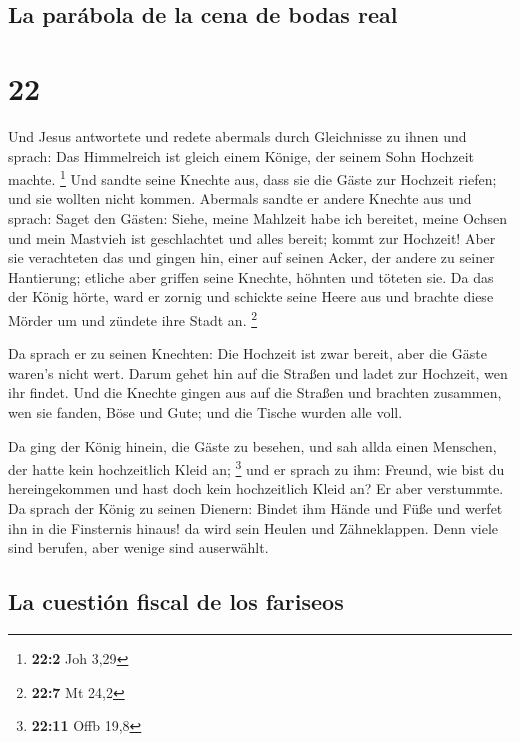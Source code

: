 \hypertarget{la-paruxe1bola-de-la-cena-de-bodas-real}{%
\subsection{La parábola de la cena de bodas
real}\label{la-paruxe1bola-de-la-cena-de-bodas-real}}

\hypertarget{section-21}{%
\section{22}\label{section-21}}

 Und Jesus antwortete und redete abermals durch
Gleichnisse zu ihnen und sprach:  Das Himmelreich ist
gleich einem Könige, der seinem Sohn Hochzeit machte. \footnote{\textbf{22:2}
  Joh 3,29}  Und sandte seine Knechte aus, dass sie die
Gäste zur Hochzeit riefen; und sie wollten nicht kommen. 
Abermals sandte er andere Knechte aus und sprach: Saget den Gästen:
Siehe, meine Mahlzeit habe ich bereitet, meine Ochsen und mein Mastvieh
ist geschlachtet und alles bereit; kommt zur Hochzeit! 
Aber sie verachteten das und gingen hin, einer auf seinen Acker, der
andere zu seiner Hantierung;  etliche aber griffen seine
Knechte, höhnten und töteten sie.  Da das der König hörte,
ward er zornig und schickte seine Heere aus und brachte diese Mörder um
und zündete ihre Stadt an. \footnote{\textbf{22:7} Mt 24,2}

 Da sprach er zu seinen Knechten: Die Hochzeit ist zwar
bereit, aber die Gäste waren's nicht wert.  Darum gehet
hin auf die Straßen und ladet zur Hochzeit, wen ihr findet.
 Und die Knechte gingen aus auf die Straßen und brachten
zusammen, wen sie fanden, Böse und Gute; und die Tische wurden alle
voll.

 Da ging der König hinein, die Gäste zu besehen, und sah
allda einen Menschen, der hatte kein hochzeitlich Kleid an; \footnote{\textbf{22:11}
  Offb 19,8}  und er sprach zu ihm: Freund, wie bist du
hereingekommen und hast doch kein hochzeitlich Kleid an? Er aber
verstummte.  Da sprach der König zu seinen Dienern:
Bindet ihm Hände und Füße und werfet ihn in die Finsternis hinaus! da
wird sein Heulen und Zähneklappen.  Denn viele sind
berufen, aber wenige sind auserwählt.

\hypertarget{la-cuestiuxf3n-fiscal-de-los-fariseos}{%
\subsection{La cuestión fiscal de los
fariseos}\label{la-cuestiuxf3n-fiscal-de-los-fariseos}}

